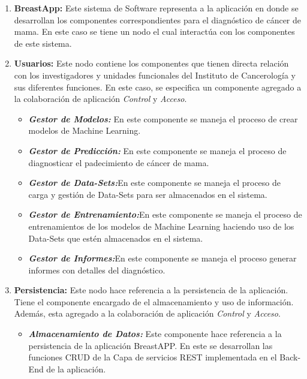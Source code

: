 \begin{enumerate}[label=\textbf{\arabic*})]
	
\item  \textbf{BreastApp:} Este sistema de Software representa a la aplicación en donde se desarrollan los componentes correspondientes para el diagnóstico de cáncer de mama. En este caso se tiene un nodo el cual interactúa con los componentes de este sistema.

\item  \textbf{Usuarios:} Este nodo contiene los componentes que tienen directa relación con los investigadores y unidades funcionales del Instituto de Cancerología y sus diferentes funciones. En este caso, se especifica un componente agregado a la colaboración de aplicación
\textit{Control} y \textit{Acceso}.

\begin{itemize}
\item  \textbf{\textit{Gestor de Modelos:}} En este componente se maneja el proceso de crear modelos de Machine Learning.
			
\item  \textbf{\textit{Gestor de Predicción:}} En este componente se maneja el proceso de diagnosticar el padecimiento de cáncer de mama.
				
\item  \textbf{\textit{Gestor de Data-Sets:}}En este componente se maneja el proceso de carga  y gestión de Data-Sets para ser almacenados en el sistema.
					
\item  \textbf{\textit{Gestor de Entrenamiento:}}En este componente se maneja el proceso de entrenamientos de los modelos de Machine Learning haciendo uso de los Data-Sets  que estén almacenados en el sistema.
						
\item  \textbf{\textit{Gestor de Informes:}}En este componente se maneja el proceso generar informes con detalles del diagnóstico.
\end{itemize}

\item  \textbf{Persistencia:} Este nodo hace referencia a la persistencia de la aplicación. Tiene el componente encargado de el almacenamiento y uso de información. Además, esta agregado a la colaboración de aplicación \textit{Control} y \textit{Acceso}.

\begin{itemize}
\item  \textbf{\textit{Almacenamiento de Datos:}} Este componente hace referencia a la persistencia de la aplicación BreastAPP. En este se desarrollan las funciones CRUD de la Capa de servicios REST implementada en el Back-End de la aplicación. 
\end{itemize} 


\end{enumerate}
